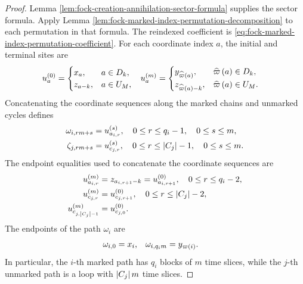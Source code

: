 \documentclass[11pt,a4paper]{article}
\theoremstyle{plain}
\theoremstyle{definition}
\theoremstyle{remark}
\begin{document}
\begin{proof}
Lemma \ref{lem:fock-creation-annihilation-sector-formula} supplies the sector formula.
Apply Lemma \ref{lem:fock-marked-index-permutation-decomposition} to each permutation in that formula.
The reindexed coefficient is \eqref{eq:fock-marked-index-permutation-coefficient}.
For each coordinate index $a$, the initial and terminal sites are
$$\begin{aligned}
u_a^{(0)}
& =
\begin{cases}
x_a, & a \in D_k,\\
z_{a-k}, & a \in U_M,
\end{cases}
&
u_a^{(m)}
& =
\begin{cases}
y_{\widehat{\varpi} \left( a \right)}, & \widehat{\varpi} \left( a \right) \in D_k,\\
z_{\widehat{\varpi} \left( a \right)-k}, & \widehat{\varpi} \left( a \right) \in U_M.
\end{cases}
\end{aligned}$$
Concatenating the coordinate sequences along the marked chains and unmarked cycles defines
$$\begin{aligned}
\omega_{i,rm+s}
& =
u_{a_{i,r}}^{(s)},
\quad
0 \leq r \leq q_i-1,
\quad
0 \leq s \leq m,
\\
\zeta_{j,rm+s}
& =
u_{c_{j,r}}^{(s)},
\quad
0 \leq r \leq \left| C_j \right|-1,
\quad
0 \leq s \leq m.
\end{aligned}$$
The endpoint equalities used to concatenate the coordinate sequences are
$$\begin{aligned}
u_{a_{i,r}}^{(m)}
& =
z_{a_{i,r+1}-k}
=
u_{a_{i,r+1}}^{(0)},
\quad
0 \leq r \leq q_i-2,
\\
u_{c_{j,r}}^{(m)}
& =
u_{c_{j,r+1}}^{(0)},
\quad
0 \leq r \leq \left| C_j \right|-2,
\\
u_{c_{j,\left| C_j \right|-1}}^{(m)}
& =
u_{c_{j,0}}^{(0)}.
\end{aligned}$$
The endpoints of the path $\omega_i$ are
$$\begin{aligned}
\omega_{i,0}
& =
x_i,
&
\omega_{i,q_i m}
& =
y_{\varpi \left( i \right)}.
\end{aligned}$$
In particular, the $i$-th marked path has $q_i$ blocks of $m$ time slices, while the $j$-th unmarked path is a
loop with $\left| C_j \right|m$ time slices.


\end{proof}
\end{document}
